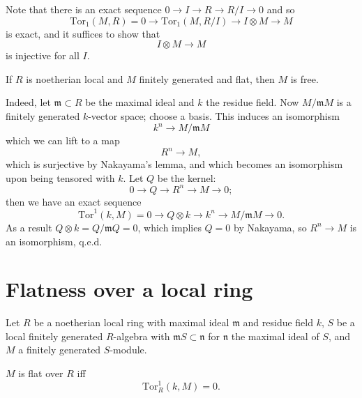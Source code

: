 Note that there is an exact sequence $0 \to I \to R \to R/I \to 0$ and
so
\[ \mathrm{Tor} _1(M,R)=0 \to \mathrm{Tor} _1(M,R/I) \to I \otimes M \to M \]
is exact, and it suffices to show that
\[ I \otimes M \to M \]
is injective for all $I$.

\begin{theorem} If $R$ is noetherian local and $M$ finitely generated and flat, then $M$ is free.
\end{theorem}
Indeed, let $\mathfrak{m} \subset R$ be the maximal ideal and $k$ the residue field.  Now $M/\mathfrak{m} M$ is a finitely generated $k$-vector space; choose a basis.  This induces an isomorphism
\[ k^n \to M/\mathfrak{m} M \]
which we can lift to a map
\[ R^n \to M ,\]
which is surjective by Nakayama's lemma, and which becomes an isomorphism upon being tensored with $k$.  Let $Q$ be the kernel:
\[ 0 \to Q \to R^n \to M \to 0;\]
then we have an exact sequence
\[ \mathrm{Tor} ^1(k,M)=0 \to Q \otimes k \to k^n \to M/\mathfrak{m} M \to 0.\]
As a result $Q \otimes k = Q/\mathfrak{m} Q = 0$, which implies $Q=0$ by Nakayama, so $R^n \to M$ is an isomorphism, q.e.d.

\section{Flatness over a local ring}

Let $R$ be a noetherian local ring with maximal ideal $\mathfrak{m}$ and residue field $k$, $S$ be a local finitely generated $R$-algebra with $\mathfrak{m}S \subset \mathfrak{n}$ for $\mathfrak{n}$ the maximal ideal of $S$, and $M$ a finitely generated $S$-module.

\begin{theorem} $M$ is flat over $R$ iff
\[ \mathrm{Tor} ^1_R( k, M) = 0.\]
\end{theorem}

